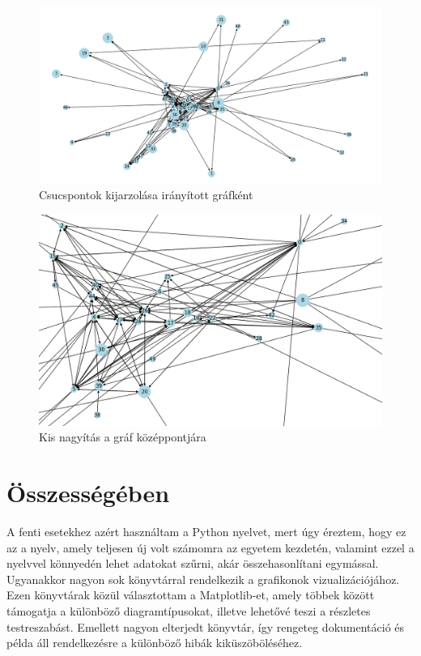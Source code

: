 \begin{figure}[h]
    \centering
    \includegraphics[scale=0.35]{images/iranyitott2}
    \caption{Csucspontok  kijarzolása irányított gráfként}
    \label{fig:enter-label}
\end{figure}
\begin{figure}[h]
    \centering
    \includegraphics[scale=0.4]{images/iranyitott3}
    \caption{Kis nagyítás a gráf középpontjára}
    \label{fig:enter-label}
\end{figure}
\newpage
\section {Összességében}

A fenti esetekhez azért használtam a Python nyelvet, mert úgy éreztem, hogy ez az a nyelv, amely teljesen új volt számomra az egyetem kezdetén, valamint ezzel a nyelvvel könnyedén lehet adatokat szűrni, akár összehasonlítani egymással. Ugyanakkor nagyon sok könyvtárral rendelkezik a grafikonok vizualizációjához. Ezen könyvtárak közül választottam a Matplotlib-et, amely többek között támogatja a különböző diagramtípusokat, illetve lehetővé teszi a részletes testreszabást. Emellett nagyon elterjedt könyvtár, így rengeteg dokumentáció és példa áll rendelkezésre a különböző hibák kiküszöböléséhez.

